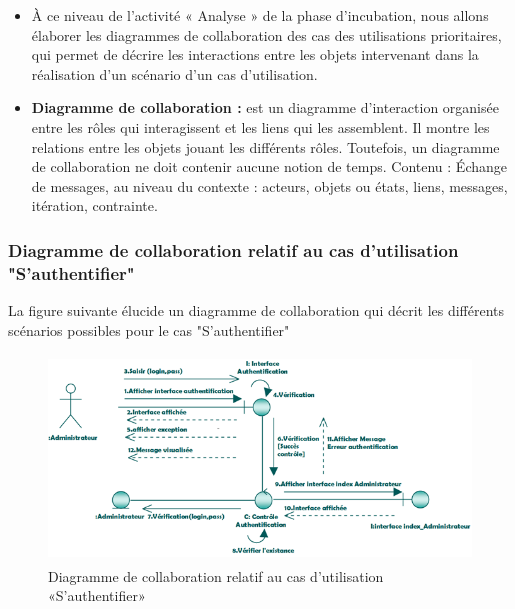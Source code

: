 \documentclass[12 pt ]{report}
\begin{document}
\begin{itemize}[font=\color{black} \Large, label=]
\item À ce niveau de l’activité « Analyse » de la phase d’incubation, nous allons élaborer les diagrammes de collaboration des cas des utilisations prioritaires, qui permet de décrire les interactions entre les
objets intervenant dans la réalisation d’un scénario d’un cas d’utilisation.
\item  \textbf{Diagramme de collaboration :} est un diagramme d’interaction organisée entre les
rôles qui interagissent et les liens qui les assemblent. Il montre les relations entre les objets jouant les différents rôles. Toutefois, un diagramme de collaboration ne doit contenir aucune notion de temps. Contenu : Échange de messages, au niveau du contexte :
acteurs, objets ou états, liens, messages, itération, contrainte.
\end{itemize}
\newpage
\subsubsection{Diagramme de collaboration relatif au cas d’utilisation "S’authentifier" }
La figure suivante élucide un diagramme de collaboration qui décrit les différents
scénarios possibles pour le cas "S'authentifier"
\begin{figure}[h]
\begin{center}
\includegraphics[width= 14cm , height =5.5cm]{colla_adm_authentification.png}
\caption{Diagramme de collaboration relatif au cas d’utilisation «S’authentifier»}
\end{center}
\end{figure}
\end{document}
